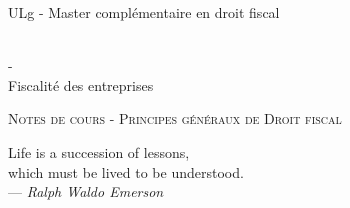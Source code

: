 \documentclass{book}
\begin{document}
\sffamily
\newcommand{\RPoint}{\protect\texttt{[image: point.png]}}
\newcommand{\RSave}{\protect\texttt{[image: Save.png]}}
\renewcommand\labelitemii{\ding{220}}
\begin{titlepage}

\begin{center}
\begin{Large}ULg - Master complémentaire en droit fiscal\end{Large}\\
\vspace{0.5cm}- \\
\vspace{0.5cm}
Fiscalité des entreprises

\end{center}
\vspace{6cm}

\LARGE
\begin{center}
\textsc{Notes de cours - Principes généraux de Droit fiscal}\\
\end{center}

\vspace{10.0cm}

\normalsize
{}

\end{titlepage}

\newpage

\thispagestyle{empty}
\setcounter{page}{0}
\null

\newpage
\thispagestyle{empty}
\setcounter{page}{0}
\vspace{20cm}

\vfill
\begin{flushright}
Life is a succession of lessons, \\
which must be lived to be understood. \\ 
--- \textit{Ralph Waldo Emerson}
\end{flushright}
\vfill
\newpage

\renewcommand{\chaptermark}[1]{\markboth{#1}{}}
\renewcommand{\sectionmark}[1]{\markright{\thesection\ #1}}
\fancyhf{} \fancyhead[LE,RO]{\bfseries\thepage}
\fancyhead[LO]{\bfseries\rightmark}
\fancyhead[RE]{\bfseries\leftmark}
\renewcommand{\headrulewidth}{0.5pt}
\addtolength{\headheight}{0.5pt}
\renewcommand{\footrulewidth}{0pt}
\fancypagestyle{plain}{ \fancyhead{}
\renewcommand{\headrulewidth}{0pt}}
\end{document}
